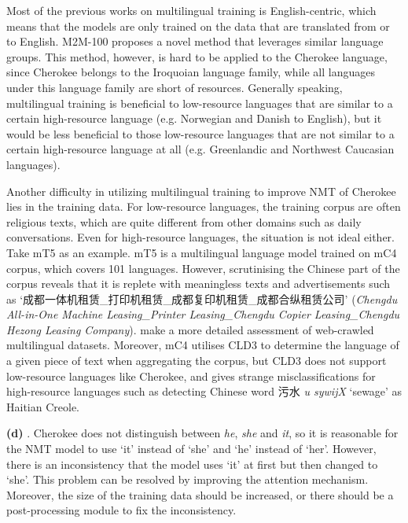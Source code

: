 \documentclass[a4paper,12pt]{report}
\newcommand{\japanesefam}[1]{{\japanesefama #1}}
\newcommand{\rom}[1]{\expandafter{\romannumeral #1\relax}}
\begin{document}
Most of the previous works on multilingual training is English-centric, which means that the models are only trained on the data that are translated from or to English. M2M-100 \cite{m2m100} proposes a novel method that leverages similar language groups. This method, however, is hard to be applied to the Cherokee language, since Cherokee belongs to the Iroquoian language family, while all languages under this language family are short of resources. Generally speaking, multilingual training is beneficial to low-resource languages that are similar to a certain high-resource language (e.g. Norwegian and Danish to English), but it would be less beneficial to those low-resource languages that are not similar to a certain high-resource language at all (e.g. Greenlandic and Northwest Caucasian languages).

Another difficulty in utilizing multilingual training to improve NMT of Cherokee lies in the training data. For low-resource languages, the training corpus are often religious texts, which are quite different from other domains such as daily conversations. Even for high-resource languages, the situation is not ideal either. Take mT5 \cite{mt5} as an example. mT5 is a multilingual language model trained on mC4 corpus, which covers 101 languages. However, scrutinising the Chinese part of the corpus reveals that it is replete with meaningless texts and advertisements such as `\japanesefam{成{\allowbreak}都{\allowbreak}一{\allowbreak}体{\allowbreak}机{\allowbreak}租{\allowbreak}赁{\allowbreak}\_{\allowbreak}打{\allowbreak}印{\allowbreak}机{\allowbreak}租{\allowbreak}赁{\allowbreak}\_{\allowbreak}成{\allowbreak}都{\allowbreak}复{\allowbreak}印{\allowbreak}机{\allowbreak}租{\allowbreak}赁{\allowbreak}\_{\allowbreak}成{\allowbreak}都{\allowbreak}合{\allowbreak}纵{\allowbreak}租{\allowbreak}赁{\allowbreak}公{\allowbreak}司}' (\textit{Chengdu All-in-One Machine Leasing\_Printer Leasing\_Chengdu Copier Leasing\_Chengdu Hezong Leasing Company}). \citeauthor{mt5ng} \cite{mt5ng} make a more detailed assessment of web-crawled multilingual datasets. Moreover, mC4 utilises CLD3 \cite{cld3} to determine the language of a given piece of text when aggregating the corpus, but CLD3 does not support low-resource languages like Cherokee, and gives strange misclassifications for high-resource languages such as detecting Chinese word \japanesefam{污水} \textit{{\textquotesingle}u sywijX} `sewage' as Haitian Creole.

\textbf{(d)} \rom{1}. Cherokee does not distinguish between \textit{he}, \textit{she} and \textit{it}, so it is reasonable for the NMT model to use `it' instead of `she' and `he' instead of `her'. However, there is an inconsistency that the model uses `it' at first but then changed to `she'. This problem can be resolved by improving the attention mechanism. Moreover, the size of the training data should be increased, or there should be a post-processing module to fix the inconsistency.
\end{document}
